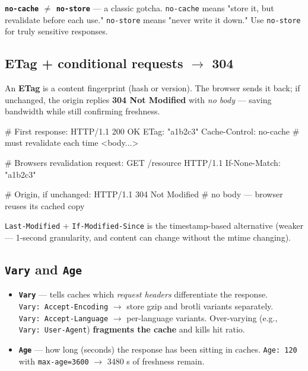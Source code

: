 \documentclass[11pt]{article}
\providecommand{\tightlist}{\setlength{\itemsep}{1pt}\setlength{\parskip}{0pt}}
\newenvironment{Shaded}{\begin{snugshade}}{\end{snugshade}}
\newcommand{\NormalTok}[1]{\textcolor[rgb]{0.81,0.81,0.76}{#1}}
\begin{document}
\textbf{\texttt{no-cache} \(\neq\) \texttt{no-store}} --- a classic gotcha. \texttt{no-cache} means "store it, but revalidate before each use." \texttt{no-store} means "never write it down." Use \texttt{no-store} for truly sensitive responses.

\subsection{\texorpdfstring{ETag + conditional requests \(\rightarrow\) 304}{ETag + conditional requests \textbackslash rightarrow 304}}\label{etag--conditional-requests-rightarrow-304}

An \textbf{ETag} is a content fingerprint (hash or version). The browser sends it back; if unchanged, the origin replies \textbf{304 Not Modified} with \emph{no body} --- saving bandwidth while still confirming freshness.


\begin{Shaded}
\begin{Highlighting}[]
\NormalTok{\# First response:}
\NormalTok{HTTP/1.1 200 OK}
\NormalTok{ETag: "a1b2c3"}
\NormalTok{Cache{-}Control: no{-}cache          \# must revalidate each time}
\NormalTok{\textless{}body...\textgreater{}}

\NormalTok{\# Browser\textquotesingle{}s revalidation request:}
\NormalTok{GET /resource HTTP/1.1}
\NormalTok{If{-}None{-}Match: "a1b2c3"}

\NormalTok{\# Origin, if unchanged:}
\NormalTok{HTTP/1.1 304 Not Modified        \# no body — browser reuses its cached copy}
\end{Highlighting}
\end{Shaded}

\texttt{Last-Modified} + \texttt{If-Modified-Since} is the timestamp-based alternative (weaker --- 1-second granularity, and content can change without the mtime changing).

\subsection{\texorpdfstring{\texttt{Vary} and \texttt{Age}}{Vary and Age}}\label{vary-and-age}

\begin{itemize}
\tightlist
\item
  \textbf{\texttt{Vary}} --- tells caches which \emph{request headers} differentiate the response. \texttt{Vary:\ Accept-Encoding} \(\rightarrow\) store gzip and brotli variants separately. \texttt{Vary:\ Accept-Language} \(\rightarrow\) per-language variants. Over-varying (e.g., \texttt{Vary:\ User-Agent}) \textbf{fragments the cache} and kills hit ratio.
\item
  \textbf{\texttt{Age}} --- how long (seconds) the response has been sitting in caches. \texttt{Age:\ 120} with \texttt{max-age=3600} \(\rightarrow\) 3480 s of freshness remain.
\end{itemize}
\end{document}
